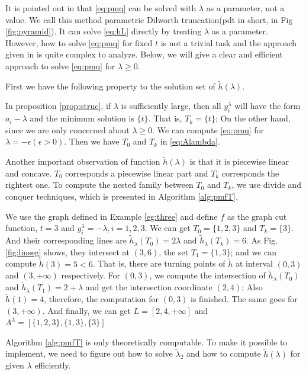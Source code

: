 \documentclass{article}
\begin{document}
It is pointed out in \cite{RN4} that \eqref{eq:pmq} can be solved with $\lambda$ as a parameter, not a value. We call this method parametric Dilworth truncation(pdt in short, in Fig \ref{fig:pyramid}). It can solve \eqref{eq:hL} directly by treating $\lambda$ as a parameter. However, how to solve \eqref{eq:pmq} for fixed $t$ is not a trivial task and the approach given in \cite{RN4} is quite complex to analyze. Below, we will give a clear and efficient approach to solve \eqref{eq:pmq} for $\lambda\geq 0$. 

First we have the following property to the solution set of $\tilde{h}(\lambda) $.


In proposition \ref{prop:struc}, if $\lambda$ is sufficiently large, then all $y_i^{\lambda}$ will have the form $a_i -  \lambda$ and the minimum solution is $\{t\}$. That is, $T_k = \{t\}$; On the other hand, since we are only concerned about $\lambda \geq 0$. We can compute \eqref{eq:pmq} for $\lambda = -\epsilon (\epsilon > 0)$. Then we have $T_0$ and $T_k$ in \eqref{eq:Alambda}.

Another important observation of function $\tilde{h}(\lambda)$ is that it is piecewise linear and concave. $T_0$ corresponds a piecewise linear part and $T_k$ corresponds the rightest one.  To compute the nested family between $T_0$ and $T_k$, we use divide and conquer techniques, which is presented in Algorithm \ref{alg:pmfT}.


\begin{example}
We use the graph defined in Example \ref{eg:three} and define $f$ as the graph cut function, $t=3$ and $y^{\lambda}_i = -\lambda, i=1,2,3$. 
We can get $T_0 = \{1,2,3\} $ and $T_k = \{3\}$. And their corresponding lines are $\tilde{h}_{\lambda}(T_0) =2\lambda$ and $\tilde{h}_{\lambda}(T_k)=6$. As Fig. \ref{fig:linseg} shows, they intersect at $(3, 6)$, the set $T_1=\{1,3\}$; and we can compute $\tilde{h}(3)=5<6$. That is, there are turning points of $\tilde{h}$ at interval $(0, 3)$ and $(3, +\infty)$ respectively. For $(0,3)$, we compute the intersection of $\tilde{h}_{\lambda}(T_0)$ and $\tilde{h}_{\lambda}(T_1)=2+\lambda$ and get the intersection coordinate $(2,4)$; Also $\tilde{h}(1)=4$, therefore, the computation for $(0,3)$ is finished. The same goes for $(3, +\infty)$. And finally, we can get $L=[2,4, +\infty]$ and $A^{\lambda} = [\{1,2,3\}, \{1,3\},\{3\}]$	
\end{example}

Algorithm \ref{alg:pmfT} is only theoretically computable. To make it possible to implement, we need to figure out how to solve $\tilde{\lambda}_2$ and how to compute $\tilde{h}(\lambda)$ for given $\lambda$ efficiently.
\end{document}
